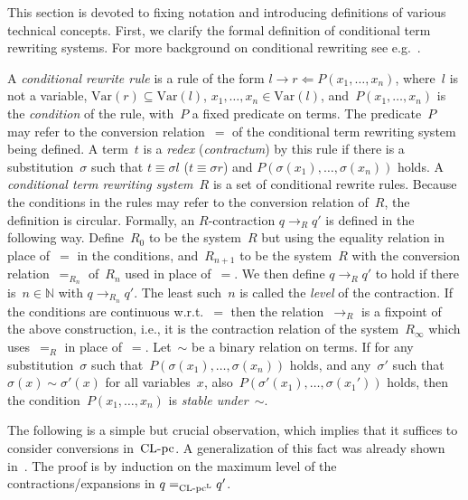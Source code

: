 \documentclass[a4paper,UKenglish]{lipics-v2016}
\newcommand{\From}{\ensuremath{\Leftarrow}}
\newcommand{\contr}{\ensuremath{\rightarrow}}
\newcommand{\Var}{\mathrm{Var}}
\newcommand{\Nbb}{\ensuremath{\mathbb{N}}}
\newcommand{\CLCz}{{\mbox{$\text{\rm CL-pc}$}}}
\newcommand{\sCLCp}{\ensuremath{\text{\rm CL-pc}^{\mathrm{L}}}}
\begin{document}
This section is devoted to fixing notation and introducing definitions
of various technical concepts. First, we clarify the formal definition
of conditional term rewriting systems. For more background on
conditional rewriting see e.g.~\cite{Terese2003}.

\begin{definition}\label{def_trs}
  A \emph{conditional rewrite rule} is a rule of the form
  $l \to r \From P(x_1,\ldots,x_n)$, where~$l$ is not a variable,
  $\Var(r) \subseteq \Var(l)$, $x_1,\ldots,x_n\in\Var(l)$,
  and~$P(x_1,\ldots,x_n)$ is the \emph{condition} of the rule,
  with~$P$ a fixed predicate on terms. The predicate~$P$ may refer to
  the conversion relation~$=$ of the conditional term rewriting system
  being defined. A term~$t$ is a \emph{redex} (\emph{contractum}) by
  this rule if there is a substitution~$\sigma$ such that
  $t \equiv \sigma l$ ($t \equiv \sigma r$) and
  $P(\sigma(x_1),\ldots,\sigma(x_n))$ holds. A \emph{conditional term
    rewriting system}~$R$ is a set of conditional rewrite
  rules. Because the conditions in the rules may refer to the
  conversion relation of~$R$, the definition is circular. Formally, an
  $R$-contraction $q \contr_R q'$ is defined in the following
  way. Define~$R_0$ to be the system~$R$ but using the equality
  relation in place of~$=$ in the conditions, and~$R_{n+1}$ to be the
  system~$R$ with the conversion relation~$=_{R_n}$ of~$R_n$ used in
  place of~$=$. We then define $q \contr_R q'$ to hold if there
  is~$n \in \Nbb$ with $q \contr_{R_n} q'$. The least such~$n$ is
  called the \emph{level} of the contraction. If the conditions are
  continuous w.r.t.~$=$ then the relation~$\contr_R$ is a fixpoint of
  the above construction, i.e., it is the contraction relation of the
  system~$R_\infty$ which uses~$=_R$ in place of~$=$. Let~$\sim$ be a
  binary relation on terms. If for any substitution~$\sigma$ such
  that~$P(\sigma(x_1),\ldots,\sigma(x_n))$ holds, and any~$\sigma'$
  such that $\sigma(x) \sim \sigma'(x)$ for all variables~$x$,
  also~$P(\sigma'(x_1),\ldots,\sigma(x_1'))$ holds, then the
  condition~$P(x_1,\ldots,x_n)$ is \emph{stable under~$\sim$}.
\end{definition}

The following is a simple but crucial observation, which implies that
it suffices to consider conversions in~$\CLCz$. A generalization of
this fact was already shown in~\cite[Lemma~3.7]{Vrijer1999}. The proof
is by induction on the maximum level of the contractions/expansions in
$q =_{\sCLCp} q'$.
\end{document}
